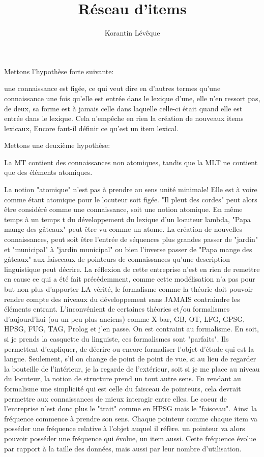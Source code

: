 \documentclass[11pt,a4paper]{article}
\author{Korantin Lévêque}
\title{Réseau d'items}
\begin{document}
Mettons l'hypothèse forte suivante:

une connaissance est figée, ce qui veut dire en d'autres termes
qu'une connaissance une fois qu'elle est entrée dans le lexique
d'une, elle n'en ressort pas, de deux, sa forme est à jamais celle dans
laquelle celle-ci était quand elle est entrée dans le lexique.
Cela n'empêche en rien la création de nouveaux items lexicaux,
Encore faut-il définir ce qu'est un item lexical.

Mettons une deuxième hypothèse:

La MT contient des connaissances non atomiques, tandis que la MLT
ne contient que des éléments atomiques.

La notion "atomique" n'est pas à prendre au sens unité minimale!
Elle est à voire comme étant atomique pour le locuteur soit figée.
"Il pleut des cordes" peut alors être considéré comme une connaissance,
soit une notion atomique. En même temps à un temps t du développement
du lexique d'un locuteur lambda, "Papa mange des gâteaux" peut être vu
comme un atome. 
La création de nouvelles connaissances, peut soit être l'entrée de séquences plus grandes
passer de "jardin" et "municipal" à "jardin municipal" ou bien l'inverse
passer de "Papa mange des gâteaux" aux faisceaux de pointeurs de connaissances
qu'une description linguistique peut décrire. 
La réflexion de cette entreprise n'est en rien de remettre en cause ce qui a été fait
précédemment, comme cette modélisation n'a pas pour but non plus d'apporter LA vérité,
le formalisme comme la théorie doit pouvoir rendre compte des niveaux du développement
sans JAMAIS contraindre les éléments entrant. L’inconvénient de certaines théories
et/ou formalismes d'aujourd'hui (ou un peu plus anciens) comme X-bar, GB,
OT, LFG, GPSG, HPSG, FUG, TAG, Prolog et j'en passe. On est contraint au formalisme.
En soit, si je prends la casquette du linguiste, ces formalismes sont "parfaits".
Ils permettent d'expliquer, de décrire ou encore formaliser l'objet d'étude qui est la langue.
Seulement, s'il on change de point de point de vue, si au lieu de regarder la bouteille de l'intérieur, 
je la regarde de l'extérieur, soit si je me place au niveau du locuteur, la notion de structure prend un tout autre sens. En rendant au formalisme une simplicité qui est celle du faisceau de pointeurs, cela devrait permettre aux connaissances de mieux interagir entre elles. Le coeur de l'entreprise n'est donc plus le "trait" comme en HPSG mais le "faisceau". Ainsi la fréquence commence à prendre son sens. Chaque pointeur comme chaque item va posséder une fréquence relative à l'objet auquel il réfère. un pointeur va alors pouvoir posséder une fréquence qui évolue, un item aussi. Cette fréquence évolue par rapport à la taille des données, mais aussi par leur nombre d'utilisation.
\end{document}
